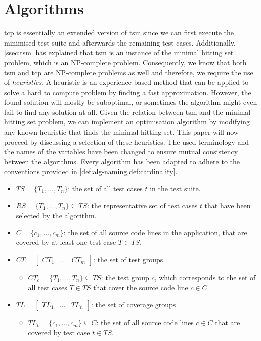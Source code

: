 
\section{Algorithms}
\label{sec:relatedwork-algorithms}
\acrshort{tcp} is essentially an extended version of \acrshort{tsm} since we can first execute the minimised test suite and afterwards the remaining test cases. Additionally, \cref{ssec:tsm} has explained that \acrshort{tsm} is an instance of the minimal hitting set problem, which is an NP-complete problem. Consequently, we know that both \acrshort{tsm} and \acrshort{tcp} are NP-complete problems as well and therefore, we require the use of \emph{heuristics}. A heuristic is an experience-based method that can be applied to solve a hard to compute problem by finding a fast approximation. However, the found solution will mostly be suboptimal, or sometimes the algorithm might even fail to find any solution at all. Given the relation between \acrshort{tsm} and the minimal hitting set problem, we can implement an optimisation algorithm by modifying any known heuristic that finds the minimal hitting set. This paper will now proceed by discussing a selection of these heuristics. The used terminology and the names of the variables have been changed to ensure mutual consistency between the algorithms. Every algorithm has been adapted to adhere to the conventions provided in \cref{def:alg-naming,def:cardinality}.

\begin{definition}
\label{def:alg-naming}
\mbox{}
\begin{itemize}
	\item $TS = \{T_1, \dots, T_n\}$: the set of all test cases $t$ in the test suite.
	\item $RS = \{T_1, \dots, T_n\} \subseteq TS$: the representative set of test cases $t$ that have been selected by the algorithm.
	\item $C = \{c_1, \dots, c_m\}$: the set of all source code lines in the application, that are covered by at least one test case $T \in TS$.
	\item $CT = \begin{bmatrix}
		CT_1 & \dots & CT_m
	\end{bmatrix}$: the set of test groups.
		\begin{itemize}
			\item $CT_c = \{T_1, \dots, T_n\} \subseteq TS$: the test group $c$, which corresponds to the set of all test cases $T \in TS$ that cover the source code line $c \in C$.
		\end{itemize}
	\item $TL = \begin{bmatrix}
		TL_1 & \dots & TL_n
	\end{bmatrix}$: the set of coverage groups.
		\begin{itemize}
			\item $TL_t = \{c_1, \dots, c_m\} \subseteq C$: the set of all source code lines $c \in C$ that are covered by test case $t \in TS$.
		\end{itemize}
\end{itemize}
\end{definition}

